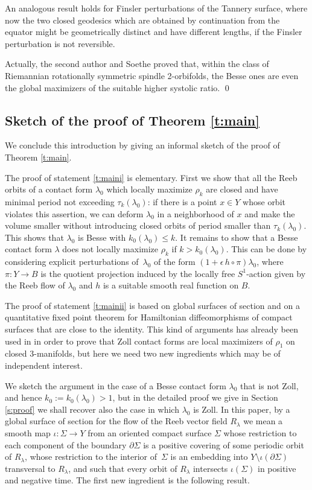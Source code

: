 \begin{exm}
An analogous result holds for Finsler perturbations of the Tannery surface, where now the two closed geodesics which are obtained by continuation from the equator might be geometrically distinct and have different lengths, if the Finsler perturbation is not reversible.

Actually, the second author and Soethe \cite{Lange:2021} proved that, within the class of Riemannian rotationally symmetric spindle 2-orbifolds, the Besse ones are even the global maximizers of the suitable higher systolic ratio.
\hfill\qed
\end{exm}

\subsection{Sketch of the proof of Theorem \ref{t:main}}
We conclude this introduction by giving an informal sketch of the proof of Theorem \ref{t:main}.

The proof of statement \eqref{t:maini} is elementary. First we show that all the Reeb orbits of a contact form $\lambda_0$ which locally maximize $\rho_k$ are closed and have minimal period not exceeding $\tau_k(\lambda_0)$: if there is a point $x\in Y$ whose orbit violates this assertion, we can deform $\lambda_0$ in a neighborhood of $x$ and make the volume smaller without introducing closed orbits of period smaller than $\tau_k(\lambda_0)$. This shows that $\lambda_0$ is Besse with $k_0(\lambda_0)\leq k$. It remains to show that a Besse contact form $\lambda$ does not locally maximize $\rho_k$ if $k> k_0(\lambda_0)$. This can be done by considering explicit perturbations of~$\lambda_0$ of the form $(1+\epsilon\, h\circ \pi) \lambda_0$, where $\pi: Y \to B$ is the quotient projection induced by the locally free $S^1$-action given by the Reeb flow of $\lambda_0$ and $h$ is a suitable smooth real function on $B$.

The proof of statement \eqref{t:mainii} is based on global surfaces of section and on a quantitative fixed point theorem for Hamiltonian diffeomorphisms of compact surfaces that are close to the identity. This kind of arguments has already been used in \cite{Abbondandolo:2018fb, Benedetti:2021aa} in order to prove that Zoll contact forms are local maximizers of $\rho_1$ on closed $3$-manifolds, but here we need two new ingredients which may be of independent interest.

We sketch the argument in the case of a Besse contact form $\lambda_0$ that is not Zoll, and hence $k_0:= k_0(\lambda_0)>1$, but in the detailed proof we give in Section \ref{s:proof} we shall recover also the case in which $\lambda_0$ is Zoll. In this paper, by a global surface of section for the flow of the Reeb vector field $R_{\lambda}$ we mean
a smooth map
$\iota: \Sigma \to Y$
from an oriented compact surface $\Sigma$ whose restriction to each component of the boundary $\partial\Sigma$ is a positive covering of some periodic orbit of $R_{\lambda}$, whose restriction to the interior of~$\Sigma$ is an embedding into $Y\setminus\iota(\partial\Sigma)$ transversal to $R_{\lambda}$, and such that every orbit of $R_{\lambda}$ intersects $\iota(\Sigma)$ in positive and negative time. The first new ingredient is the following result.


